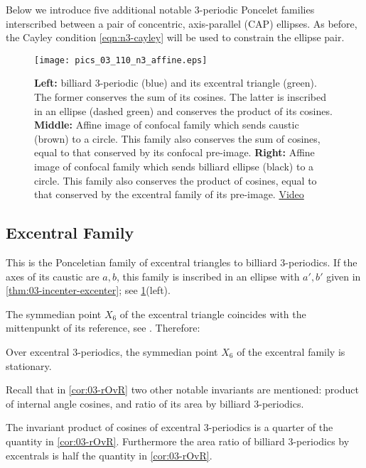Below we introduce five additional notable 3-periodic Poncelet families interscribed between a pair of concentric, axis-parallel (CAP) ellipses. As before, the Cayley condition \cref{eqn:n3-cayley} will be used to constrain the ellipse pair. 

\begin{figure}
    \centering
    \texttt{[image: pics\_03\_110\_n3\_affine.eps]}
    \caption{\textbf{Left:} billiard 3-periodic (blue) and its excentral triangle (green). The former conserves the sum of its cosines. The latter is inscribed in an ellipse (dashed green) and conserves the product of its cosines. \textbf{Middle:} Affine image of confocal family which sends caustic (brown) to a circle. This family also conserves the sum of cosines, equal to that conserved by its confocal pre-image. \textbf{Right:} Affine image of confocal family which sends billiard ellipse (black) to a circle. This family also conserves the product of cosines, equal to that conserved by the excentral family of its pre-image. \href{https://youtu.be/HjBZdrR3Azs}{Video}}
    \label{fig:03-n3-affine}
\end{figure}

\subsection{Excentral Family}

This is the Ponceletian family of excentral triangles to billiard 3-periodics. If the axes of its caustic are $a,b$, this family is inscribed in an ellipse with $a',b'$ given in \cref{thm:03-incenter-excenter}; see \cref{fig:03-n3-affine}(left).

The symmedian point $X_6$ of the excentral triangle coincides with the mittenpunkt of its reference, see \cite[X(6)]{etc}. Therefore:

\begin{corollary}
Over excentral 3-periodics, the symmedian point $X_6$ of the excentral family is stationary.
\end{corollary}

Recall that in \cref{cor:03-rOvR} two other notable invariants are mentioned: product of internal angle cosines, and ratio of its area by billiard 3-periodics.

\begin{corollary}
The invariant product of cosines of excentral 3-periodics is a quarter of the quantity in \cref{cor:03-rOvR}. Furthermore the area ratio of billiard 3-periodics by excentrals is half the quantity in \cref{cor:03-rOvR}.
\end{corollary}

